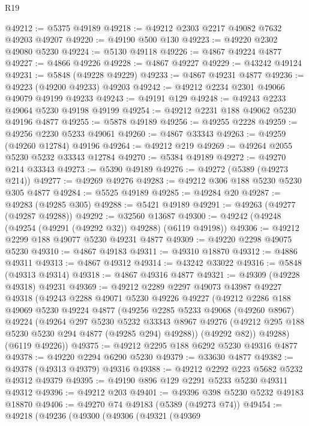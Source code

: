 \begin{lexlean}{R19}
\begin{coremodule}
@49212 := @5375 @49189
@49218 := @49212 @2303 @2217 @49082 @7632 @49203 @49207
@49220 := @49190 @500 @130
@49223 := @49220 @2302 @49080 @5230
@49224 := @5130 @49118
@49226 := @4867 @49224 @4877
@49227 := @4866 @49226
@49228 := @4867 @49227
@49229 := @43242 @49124
@49231 := @5848 (@49228 @49229)
@49233 := @4867 @49231 @4877
@49236 := @49223 (@49200 @49233) @49203
@49242 := @49212 @2234 @2301 @49066 @49079 @49199 @49233
@49243 := @49191 @129
@49248 := @49243 @2233 @49064 @5230 @49198 @49199
@49254 := @49212 @2231 @188 @49062 @5230 @49196 @4877
@49255 := @5878 @49189
@49256 := @49255 @2228
@49259 := @49256 @2230 @5233 @49061
@49260 := @4867 @33343
@49263 := @49259 (@49260 @12784) @49196
@49264 := @49212 @219
@49269 := @49264 @2055 @5230 @5232 @33343 @12784
@49270 := @5384 @49189
@49272 := @49270 @214 @33343
@49273 := @5390 @49189
@49276 := @49272 (@5389 (@49273 @214))
@49277 := @49269 @49276
@49283 := @49212 @306 @188 @5230 @5230 @305 @4877
@49284 := @5525 @49189
@49285 := @49284 @20
@49287 := @49283 (@49285 @305)
@49288 := @5421 @49189
@49291 := @49263 (@49277 (@49287 @49288))
@49292 := @32560 @13687
@49300 := @49242 (@49248 (@49254 (@49291 (@49292 @32)) @49288) (@6119 @49198))
@49306 := @49212 @2299 @188 @49077 @5230 @49231 @4877
@49309 := @49220 @2298 @49075 @5230
@49310 := @4867 @49183
@49311 := @49310 @18870
@49312 := @4886 @49311
@49313 := @4867 @49312
@49314 := @43242 @33022
@49316 := @5848 (@49313 @49314)
@49318 := @4867 @49316 @4877
@49321 := @49309 (@49228 @49318) @49231
@49369 := @49212
    @2289
    @2297
    @49073
    @43987
    @49227
    @49318
    (@49243
      @2288
      @49071
      @5230
      @49226
      @49227
      (@49212
        @2286
        @188
        @49069
        @5230
        @49224
        @4877
        (@49256
          @2285
          @5233
          @49068
          (@49260 @8967)
          @49224
          (@49264
            @297
            @5230
            @5232
            @33343
            @8967
            @49276
            (@49212 @295 @188 @5230 @5230 @294 @4877 (@49285 @294) @49288))
          (@49292 @82))
        @49288)
      (@6119 @49226))
@49375 := @49212 @2295 @188 @6292 @5230 @49316 @4877
@49378 := @49220 @2294 @6290 @5230
@49379 := @33630 @4877
@49382 := @49378 (@49313 @49379) @49316
@49388 := @49212 @2292 @223 @5682 @5232 @49312 @49379
@49395 := @49190 @896 @129 @2291 @5233 @5230 @49311 @49312
@49396 := @49212 @203
@49401 := @49396 @398 @5230 @5232 @49183 @18870
@49406 := @49270 @74 @49183 (@5389 (@49273 @74))
@49454 := @49218
    (@49236
      (@49300
        (@49306
          (@49321
            (@49369

\end{coremodule}
\end{lexlean}
